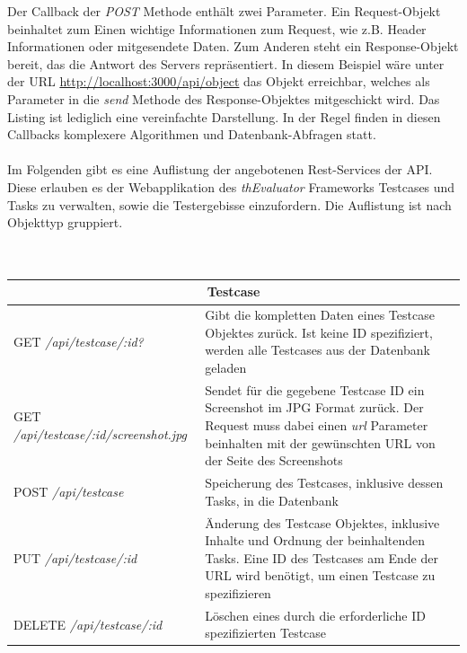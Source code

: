 Der Callback der \textit{POST} Methode enthält zwei Parameter. Ein Request-Objekt beinhaltet zum Einen wichtige Informationen zum Request, wie z.B. Header Informationen oder mitgesendete Daten. Zum Anderen steht ein Response-Objekt bereit, das die Antwort des Servers repräsentiert. In diesem Beispiel wäre unter der URL \url{http://localhost:3000/api/object} das Objekt erreichbar, welches als Parameter in die \textit{send} Methode des Response-Objektes mitgeschickt wird. Das Listing ist lediglich eine vereinfachte Darstellung. In der Regel finden in diesen Callbacks komplexere Algorithmen und Datenbank-Abfragen statt.\\
\\
Im Folgenden gibt es eine Auflistung der angebotenen Rest-Services der API. Diese erlauben es der Webapplikation des \textit{thEvaluator} Frameworks Testcases und Tasks zu verwalten, sowie die Testergebisse einzufordern. Die Auflistung ist nach Objekttyp gruppiert.\\
\\
\\
{\footnotesize
\begin{tabular}{ p{5.5cm} p{9cm} }
  \hline
  \multicolumn{2}{c}{\textbf{Testcase}} \\
  \hline
  GET \textit{/api/testcase/:id?} & Gibt die kompletten Daten eines Testcase Objektes zurück. Ist keine ID spezifiziert, werden alle Testcases aus der Datenbank geladen\vspace{0.2cm}\\
  GET \textit{/api/testcase/:id/screenshot.jpg} & Sendet für die gegebene Testcase ID ein Screenshot im JPG Format zurück. Der Request muss dabei einen \textit{url} Parameter beinhalten mit der gewünschten URL von der Seite des Screenshots\vspace{0.2cm}\\
  POST \textit{/api/testcase} & Speicherung des Testcases, inklusive dessen Tasks, in die Datenbank\vspace{0.2cm}\\
  PUT \textit{/api/testcase/:id} & Änderung des Testcase Objektes, inklusive Inhalte und Ordnung der beinhaltenden Tasks. Eine ID des Testcases am Ende der URL wird benötigt, um einen Testcase zu spezifizieren\vspace{0.2cm}\\
  DELETE \textit{/api/testcase/:id} & Löschen eines durch die erforderliche ID spezifizierten Testcase\vspace{0.2cm}\\
  \hline
\end{tabular}
}

